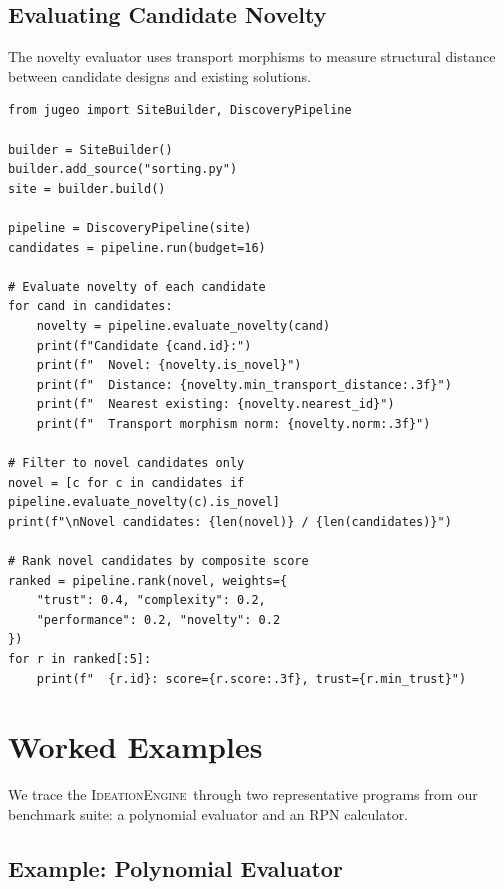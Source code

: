 \documentclass[11pt]{article}
\newcommand{\IdeationEngine}{\textsc{IdeationEngine}}
\begin{document}
\subsection{Evaluating Candidate Novelty}

The novelty evaluator uses transport morphisms to measure structural
distance between candidate designs and existing solutions.

\begin{lstlisting}[style=jugeo-python]
from jugeo import SiteBuilder, DiscoveryPipeline

builder = SiteBuilder()
builder.add_source("sorting.py")
site = builder.build()

pipeline = DiscoveryPipeline(site)
candidates = pipeline.run(budget=16)

# Evaluate novelty of each candidate
for cand in candidates:
    novelty = pipeline.evaluate_novelty(cand)
    print(f"Candidate {cand.id}:")
    print(f"  Novel: {novelty.is_novel}")
    print(f"  Distance: {novelty.min_transport_distance:.3f}")
    print(f"  Nearest existing: {novelty.nearest_id}")
    print(f"  Transport morphism norm: {novelty.norm:.3f}")

# Filter to novel candidates only
novel = [c for c in candidates if pipeline.evaluate_novelty(c).is_novel]
print(f"\nNovel candidates: {len(novel)} / {len(candidates)}")

# Rank novel candidates by composite score
ranked = pipeline.rank(novel, weights={
    "trust": 0.4, "complexity": 0.2,
    "performance": 0.2, "novelty": 0.2
})
for r in ranked[:5]:
    print(f"  {r.id}: score={r.score:.3f}, trust={r.min_trust}")
\end{lstlisting}

\section{Worked Examples}\label{sec:worked}

We trace the \IdeationEngine\ through two representative programs from
our benchmark suite: a polynomial evaluator and an RPN calculator.

\subsection{Example: Polynomial Evaluator}
\end{document}
